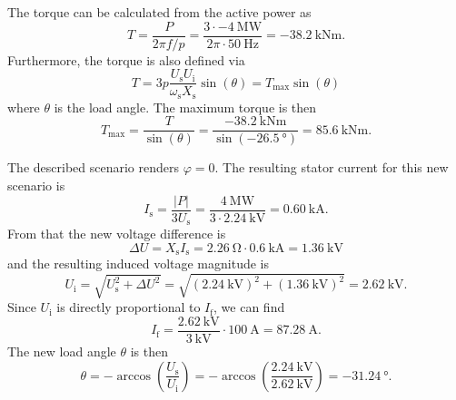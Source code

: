 \begin{solutionblock}
    The torque can be calculated from the active power as
    $$T = \frac{P}{2\pi f/p} = \frac{3\cdot\SI{-4}{\mega\watt}}{2\pi \cdot \SI{50}{\hertz}} = \SI{-38.2}{\kilo\newton\meter}.$$
    Furthermore, the torque is also defined via 
    $$
    T = 3 p \frac{U_\mathrm{s}U_\mathrm{i}}{\omega_\mathrm{s} X_\mathrm{s}}\sin(\theta) = T_\mathrm{max} \sin(\theta)
    $$ 
    where $\theta$ is the load angle. The maximum torque is then 
    $$
    T_\mathrm{max} = \frac{T}{\sin(\theta)} = \frac{\SI{-38.2}{\kilo\newton\meter}}{\sin(\SI{-26.5}{\degree})} = \SI{85.6}{\kilo\newton\meter}.
    $$
\end{solutionblock}


\begin{solutionblock}
    The described scenario renders $\varphi=0$. The resulting stator current for this new scenario is
    $$
    I_\mathrm{s} = \frac{|P|}{3 U_\mathrm{s}} = \frac{\SI{4}{\mega\watt}}{3 \cdot \SI{2.24}{\kilo\volt}} = \SI{0.60}{\kilo\ampere}.$$
    From that the new voltage difference is
    $$
    \Delta U = X_\mathrm{s} I_\mathrm{s} = \SI{2.26}{\ohm} \cdot \SI{0.6}{\kilo\ampere} = \SI{1.36}{\kilo\volt}
    $$
    and the resulting induced voltage magnitude is
    $$
    U_\mathrm{i} = \sqrt{U_\mathrm{s}^2 + \Delta U^2} = \sqrt{(\SI{2.24}{\kilo\volt})^2 + (\SI{1.36}{\kilo\volt})^2} = \SI{2.62}{\kilo\volt}.
    $$
    Since $U_\mathrm{i}$ is directly proportional to $I_\mathrm{f}$, we can find
    $$
    I_\mathrm{f} = \frac{\SI{2.62}{\kilo\volt}}{\SI{3}{\kilo\volt}} \cdot\SI{100}{\ampere} = \SI{87.28}{\ampere}.
    $$
    The new load angle $\theta$ is then
    $$
    \theta = -\arccos\left(\frac{U_\mathrm{s}}{U_\mathrm{i}}\right) = -\arccos\left(\frac{\SI{2.24}{\kilo\volt}}{\SI{2.62}{\kilo\volt}}\right) = \SI{-31.24}{\degree}.
    $$
\end{solutionblock}




